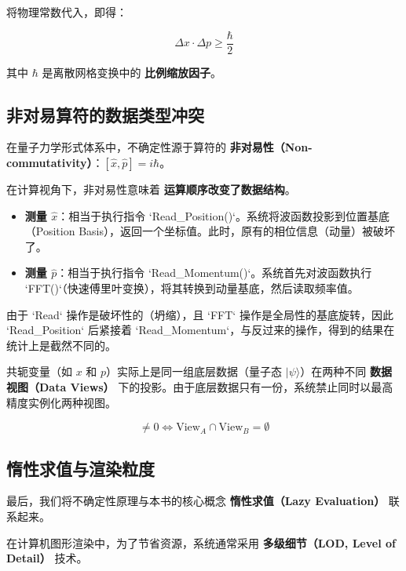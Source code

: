 将物理常数代入，即得：

\begin{equation}
\Delta x \cdot \Delta p \ge \frac{\hbar}{2}
\end{equation}

其中 $\hbar$ 是离散网格变换中的 \textbf{比例缩放因子}。

\subsection{非对易算符的数据类型冲突}

在量子力学形式体系中，不确定性源于算符的 \textbf{非对易性（Non-commutativity）}：$[\hat{x}, \hat{p}] = i\hbar$。

在计算视角下，非对易性意味着 \textbf{运算顺序改变了数据结构}。

\begin{itemize}
\item \textbf{测量 $\hat{x}$}：相当于执行指令 `Read_Position()`。系统将波函数投影到位置基底（Position Basis），返回一个坐标值。此时，原有的相位信息（动量）被破坏了。

\item \textbf{测量 $\hat{p}$}：相当于执行指令 `Read_Momentum()`。系统首先对波函数执行 `FFT()`（快速傅里叶变换），将其转换到动量基底，然后读取频率值。
\end{itemize}

由于 `Read` 操作是破坏性的（坍缩），且 `FFT` 操作是全局性的基底旋转，因此 `Read_Position` 后紧接着 `Read_Momentum`，与反过来的操作，得到的结果在统计上是截然不同的。

\begin{theorem}[互斥精度协议]
共轭变量（如 $x$ 和 $p$）实际上是同一组底层数据（量子态 $|\psi\rangle$）在两种不同 \textbf{数据视图（Data Views）} 下的投影。由于底层数据只有一份，系统禁止同时以最高精度实例化两种视图。

\begin{equation}
[\hat{A}, \hat{B}] \neq 0 \iff \text{View}_A \cap \text{View}_B = \emptyset
\end{equation}
\end{theorem}

\subsection{惰性求值与渲染粒度}

最后，我们将不确定性原理与本书的核心概念 \textbf{惰性求值（Lazy Evaluation）} 联系起来。

在计算机图形渲染中，为了节省资源，系统通常采用 \textbf{多级细节（LOD, Level of Detail）} 技术。

